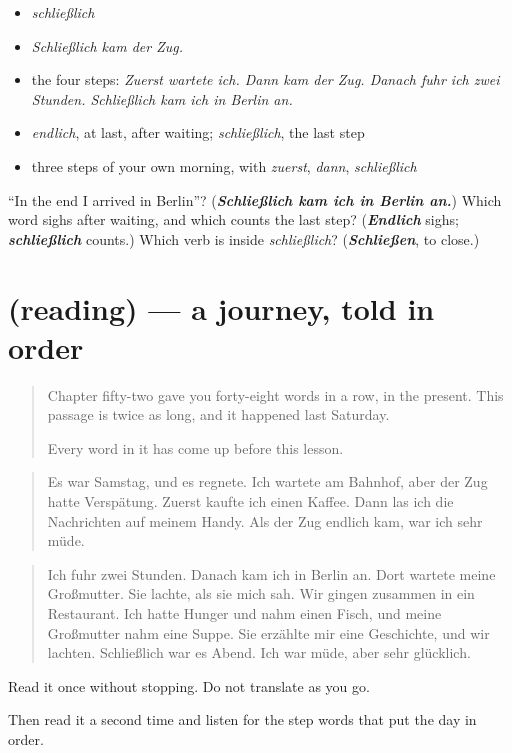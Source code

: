 \begin{itemize}
\raggedright
  \item \emph{schließlich}
  \item \emph{Schließlich kam der Zug.}
  \item the four steps: \emph{Zuerst wartete ich. Dann kam der Zug. Danach fuhr ich zwei Stunden. Schließlich kam ich in Berlin an.}
  \item \emph{endlich}, at last, after waiting; \emph{schließlich}, the last step
  \item three steps of your own morning, with \emph{zuerst}, \emph{dann}, \emph{schließlich}
\end{itemize}

\begin{tcolorbox}[breakable,colback=teal!4,colframe=teal!35!black,title={Before you move on}]
\textquotedblleft{}In the end I arrived in Berlin\textquotedblright{}? (\emph{\textbf{Schließlich kam ich in Berlin an.}}) Which word sighs after waiting, and which counts the last step? (\emph{\textbf{Endlich}} sighs; \emph{\textbf{schließlich}} counts.) Which verb is inside \emph{schließlich}? (\emph{\textbf{Schließen}}, to close.)
\end{tcolorbox}
\section[(reading)]{(reading) — a journey, told in order}

\label{lesson:GE-C253-lesung}



\begin{quote}
Chapter fifty-two gave you forty-eight words in a row, in the present. This passage is twice as long, and it happened last Saturday.

Every word in it has come up before this lesson.
\end{quote}

\begin{tcolorbox}[breakable,skin=enhanced,colback=orange!6,colframe=orange!45!black,boxrule=0.5pt,arc=1mm,left=6pt,right=6pt,top=4pt,bottom=4pt,fonttitle=\bfseries,title={Read this}]
\begin{quote}
Es war Samstag, und es regnete. Ich wartete am Bahnhof, aber der Zug hatte Verspätung. Zuerst kaufte ich einen Kaffee. Dann las ich die Nachrichten auf meinem Handy. Als der Zug endlich kam, war ich sehr müde.
\end{quote}

\begin{quote}
Ich fuhr zwei Stunden. Danach kam ich in Berlin an. Dort wartete meine Großmutter. Sie lachte, als sie mich sah. Wir gingen zusammen in ein Restaurant. Ich hatte Hunger und nahm einen Fisch, und meine Großmutter nahm eine Suppe. Sie erzählte mir eine Geschichte, und wir lachten. Schließlich war es Abend. Ich war müde, aber sehr glücklich.
\end{quote}

Read it once without stopping. Do not translate as you go.

Then read it a second time and listen for the step words that put the day in order.
\end{tcolorbox}

